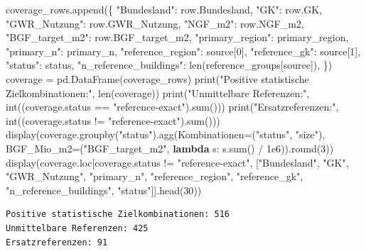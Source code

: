 \documentclass[
  ngerman,
  a4paper,
  DIV=11]{scrreprt}
\newenvironment{Shaded}{\begin{snugshade}}{\end{snugshade}}
\newcommand{\BuiltInTok}[1]{\textcolor[rgb]{0.00,0.23,0.31}{#1}}
\newcommand{\DecValTok}[1]{\textcolor[rgb]{0.68,0.00,0.00}{#1}}
\newcommand{\FloatTok}[1]{\textcolor[rgb]{0.68,0.00,0.00}{#1}}
\newcommand{\KeywordTok}[1]{\textcolor[rgb]{0.00,0.23,0.31}{\textbf{#1}}}
\newcommand{\NormalTok}[1]{\textcolor[rgb]{0.00,0.23,0.31}{#1}}
\newcommand{\OperatorTok}[1]{\textcolor[rgb]{0.37,0.37,0.37}{#1}}
\newcommand{\StringTok}[1]{\textcolor[rgb]{0.13,0.47,0.30}{#1}}
\begin{document}
\begin{Shaded}
\begin{Highlighting}[]
\NormalTok{    coverage\_rows.append(\{}
        \StringTok{"Bundesland"}\NormalTok{: row.Bundesland, }\StringTok{"GK"}\NormalTok{: row.GK, }\StringTok{"GWR\_Nutzung"}\NormalTok{: row.GWR\_Nutzung,}
        \StringTok{"NGF\_m2"}\NormalTok{: row.NGF\_m2, }\StringTok{"BGF\_target\_m2"}\NormalTok{: row.BGF\_target\_m2,}
        \StringTok{"primary\_region"}\NormalTok{: primary\_region, }\StringTok{"primary\_n"}\NormalTok{: primary\_n,}
        \StringTok{"reference\_region"}\NormalTok{: source[}\DecValTok{0}\NormalTok{], }\StringTok{"reference\_gk"}\NormalTok{: source[}\DecValTok{1}\NormalTok{],}
        \StringTok{"status"}\NormalTok{: status, }\StringTok{"n\_reference\_buildings"}\NormalTok{: }\BuiltInTok{len}\NormalTok{(reference\_groups[source]),}
\NormalTok{    \})}
\NormalTok{coverage }\OperatorTok{=}\NormalTok{ pd.DataFrame(coverage\_rows)}
\BuiltInTok{print}\NormalTok{(}\StringTok{"Positive statistische Zielkombinationen:"}\NormalTok{, }\BuiltInTok{len}\NormalTok{(coverage))}
\BuiltInTok{print}\NormalTok{(}\StringTok{"Unmittelbare Referenzen:"}\NormalTok{, }\BuiltInTok{int}\NormalTok{((coverage.status }\OperatorTok{==} \StringTok{"reference{-}exact"}\NormalTok{).}\BuiltInTok{sum}\NormalTok{()))}
\BuiltInTok{print}\NormalTok{(}\StringTok{"Ersatzreferenzen:"}\NormalTok{, }\BuiltInTok{int}\NormalTok{((coverage.status }\OperatorTok{!=} \StringTok{"reference{-}exact"}\NormalTok{).}\BuiltInTok{sum}\NormalTok{()))}
\NormalTok{display(coverage.groupby(}\StringTok{"status"}\NormalTok{).agg(Kombinationen}\OperatorTok{=}\NormalTok{(}\StringTok{"status"}\NormalTok{, }\StringTok{"size"}\NormalTok{),}
\NormalTok{                    BGF\_Mio\_m2}\OperatorTok{=}\NormalTok{(}\StringTok{"BGF\_target\_m2"}\NormalTok{, }\KeywordTok{lambda}\NormalTok{ s: s.}\BuiltInTok{sum}\NormalTok{() }\OperatorTok{/} \FloatTok{1e6}\NormalTok{)).}\BuiltInTok{round}\NormalTok{(}\DecValTok{3}\NormalTok{))}
\NormalTok{display(coverage.loc[coverage.status }\OperatorTok{!=} \StringTok{"reference{-}exact"}\NormalTok{, [}\StringTok{"Bundesland"}\NormalTok{, }\StringTok{"GK"}\NormalTok{, }\StringTok{"GWR\_Nutzung"}\NormalTok{,}
               \StringTok{"primary\_n"}\NormalTok{, }\StringTok{"reference\_region"}\NormalTok{, }\StringTok{"reference\_gk"}\NormalTok{, }\StringTok{"n\_reference\_buildings"}\NormalTok{, }\StringTok{"status"}\NormalTok{]].head(}\DecValTok{30}\NormalTok{))}
\end{Highlighting}
\end{Shaded}

\begin{verbatim}
Positive statistische Zielkombinationen: 516
Unmittelbare Referenzen: 425
Ersatzreferenzen: 91
\end{verbatim}
\end{document}
